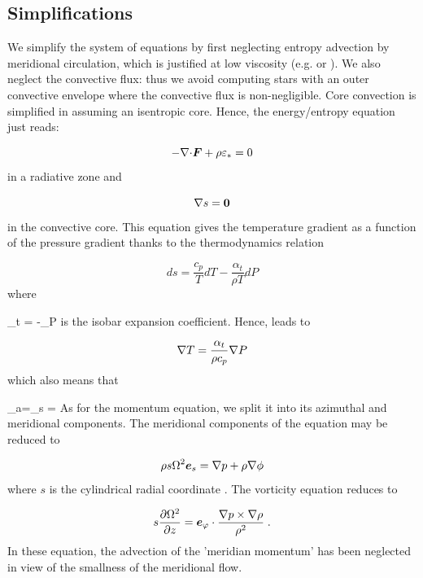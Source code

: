 \subsection{Simplifications}

We simplify the system of equations by first neglecting entropy
advection by meridional circulation, which is justified at low viscosity
(e.g. \href{http://arxiv.org/abs/astro-ph/0608431}{\citealt{R06b}} or
\citealt{RELP16}).
We also neglect the convective flux: thus we avoid computing stars
with an outer convective envelope where the convective flux is
non-negligible. Core convection is simplified in assuming an isentropic
core. Hence, the energy/entropy equation just reads:

\begin{equation} -\Div\vF + \rho\eps_* = 0\end{equation}
in a radiative zone and

\begin{equation} \na s ={\vec 0}\label{nas}\end{equation}
in the convective core. This equation gives the temperature gradient as a function
of the pressure gradient thanks to the thermodynamics relation

\[ ds = \frac{c_p}{T}dT - \frac{\alpha_t}{\rho T}dP\]
where 

\beq \alpha_t = -\lp{}\rp_{\!\!P}
is the isobar expansion coefficient. Hence,  leads to

\begin{equation} \na T = \frac{\alpha_t}{\rho c_p}\na P\end{equation}
which also means that

\beq \nabla_a=\lp{}\rp_{\!\!s} =
As for the momentum equation, we split it into its azimuthal and
meridional components. The meridional components of the equation may be
reduced to

\begin{equation}
\rho s\Omega^2\es=\na p+\rho\na\phi
\label{baroc}
\end{equation}
where $s$ is the cylindrical radial coordinate \cite[e.g.][hereafter
referred to as ELR]{ELR13}. The vorticity equation reduces to

\begin{equation}
\label{eq:vort_inv}
s\frac{\partial\Omega^2}{\partial z}=\ephi\cdot\frac{\na
p\times\na\rho}{\rho^2} \;.
\end{equation}
In these equation, the advection of the 'meridian momentum' has been
neglected in view of the smallness of the meridional flow.

